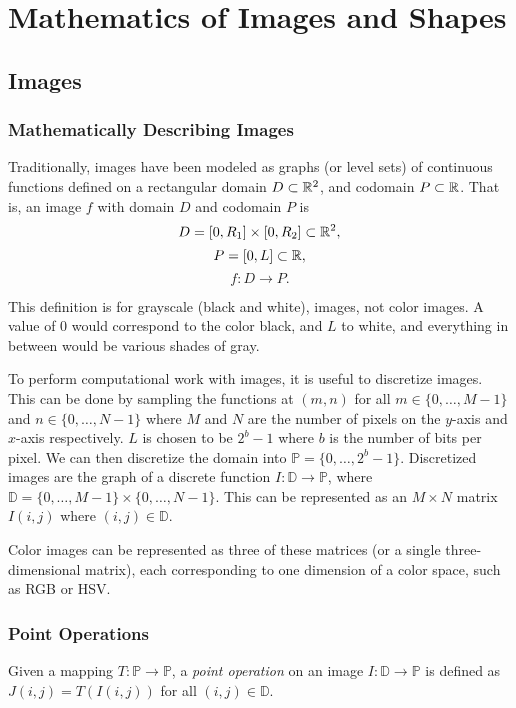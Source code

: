 \chapter{Mathematics of Images and Shapes}
\label{ch:images}

\section{Images}

\subsection{Mathematically Describing Images}

Traditionally, images have been modeled as graphs (or level sets) of continuous functions defined on a rectangular domain $D \subset \mathbb{R}^2$, and codomain $P \subset \mathbb{R}$. That is, an image $f$ with domain $D$ and codomain $P$ is \[D = \left[0, R_1\right] \times \left[0, R_2\right] \subset \mathbb{R}^2,\] \[P = \left[0, L\right] \subset \mathbb{R},\] \[f : D \to P.\]

This definition is for grayscale (black and white), images, not color images. A value of $0$ would correspond to the color black, and $L$ to white, and everything in between would be various shades of gray.

To perform computational work with images, it is useful to discretize images. This can be done by sampling the functions at $(m, n)$ for all $m \in \{0, \ldots, M-1\}$ and $n \in \{0, \ldots, N-1\}$ where $M$ and $N$ are the number of pixels on the $y$-axis and $x$-axis respectively. $L$ is chosen to be $2^b-1$ where $b$ is the number of bits per pixel. We can then discretize the domain into $\mathbb{P} = \{0, \ldots, 2^b-1\}$. Discretized images are the graph of a discrete function $I: \mathbb{D} \to \mathbb{P}$, where $\mathbb{D} = \{0, \ldots, M-1\} \times \{0, \ldots, N-1\}$. This can be represented as an $M \times N$ matrix $I(i, j)$ where $(i, j) \in \mathbb{D}$.

Color images can be represented as three of these matrices (or a single three-dimensional matrix), each corresponding to one dimension of a color space, such as RGB or HSV.

\subsection{Point Operations}

\begin{defn}
    Given a mapping $T: \mathbb{P} \to \mathbb{P}$, a \emph{point operation} on an image $I: \mathbb{D} \to \mathbb{P}$ is defined as $J(i, j) = T(I(i, j))$ for all $(i, j) \in \mathbb{D}$.
\end{defn}

